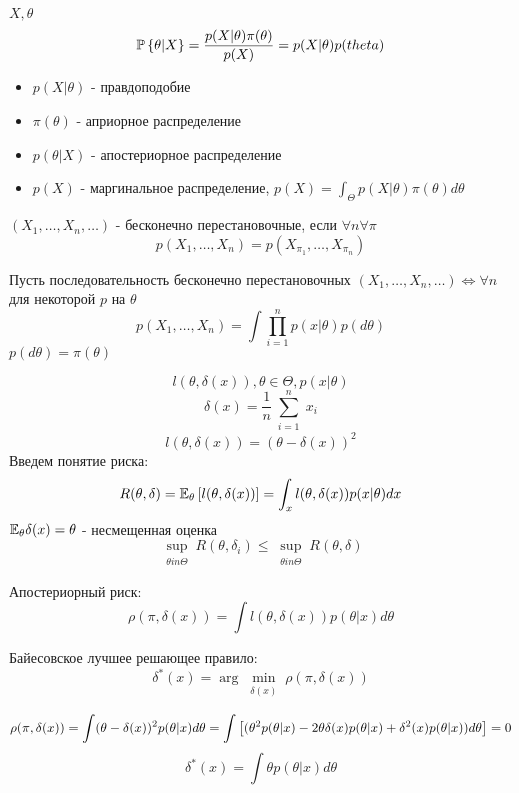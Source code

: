 $X, \theta$
$$ \mathbb{P}\left\{ \theta|X \right\} = \frac{p(X|\theta)\pi(\theta)}{p(X)} = p(X|\theta)p(theta)$$
\begin{itemize}
	\item $p(X|\theta)$ - правдоподобие
	\item $\pi(\theta)$ - априорное распределение
	\item $p(\theta|X)$ - апостериорное распределение
	\item $p(X)$ - маргинальное распределение, $p(X) = \int_{\Theta} p(X|\theta)\pi(\theta)d\theta$
\end{itemize}

\begin{definition}
$(X_1, \ldots, X_n, \ldots)$ - бесконечно перестановочные, если $\forall n \forall \pi$ $$ p(X_1, \ldots, X_n) = p(X_{\pi_1}, \ldots, X_{\pi_n})$$
\end{definition}

\begin{theorem}[де Финетти]
Пусть последовательность бесконечно перестановочных	$(X_1, \ldots, X_n, \ldots) \Leftrightarrow \forall n$ для некоторой $p$ на $\theta$
$$ p(X_1, \ldots, X_n) = \int \prod_{i=1}^n p(x|\theta) p(d\theta) $$
$p(d\theta) = \pi(\theta)$
\end{theorem}

$$ l(\theta, \delta(x)), \theta \in \Theta, p(x|\theta) $$
$$ \delta(x) = \frac{1}{n} \sum_{\substack{i=1}}^n x_i $$
$$ l(\theta, \delta(x)) = (\theta-\delta(x))^2 $$
Введем понятие риска:
$$ R(\theta, \delta) = \mathbb{E}_{\theta}\left[ l(\theta, \delta(x)) \right] = \int_x l(\theta, \delta(x)) p(x|\theta) dx $$
$\mathbb{E}_{\theta} \delta(x) = \theta$ - несмещенная оценка
$$ \sup_{\substack{\theta in \Theta}} R(\theta, \delta_i) \leq \sup_{\substack{\theta in \Theta}} R(\theta, \delta)$$

\begin{definition}
	Апостериорный риск: $$ \rho(\pi, \delta(x)) = \int l(\theta, \delta(x)) p(\theta|x) d\theta $$
\end{definition}

\begin{definition}
	Байесовское лучшее решающее правило: $$ \delta^*(x) = \arg \min_{\substack{\delta(x)}} \rho(\pi, \delta(x)) $$
\end{definition}

\begin{example}
	$$\rho(\pi, \delta(x)) =\int (\theta - \delta(x))^2 p(\theta|x) d\theta  = \int \left[ (\theta^2p(\theta|x) - 2\theta\delta(x)p(\theta|x) + 
	\delta^2(x)p(\theta|x))d\theta \right] = 0$$
	$$ \delta^*(x) = \int \theta p(\theta|x)d\theta$$
\end{example}

